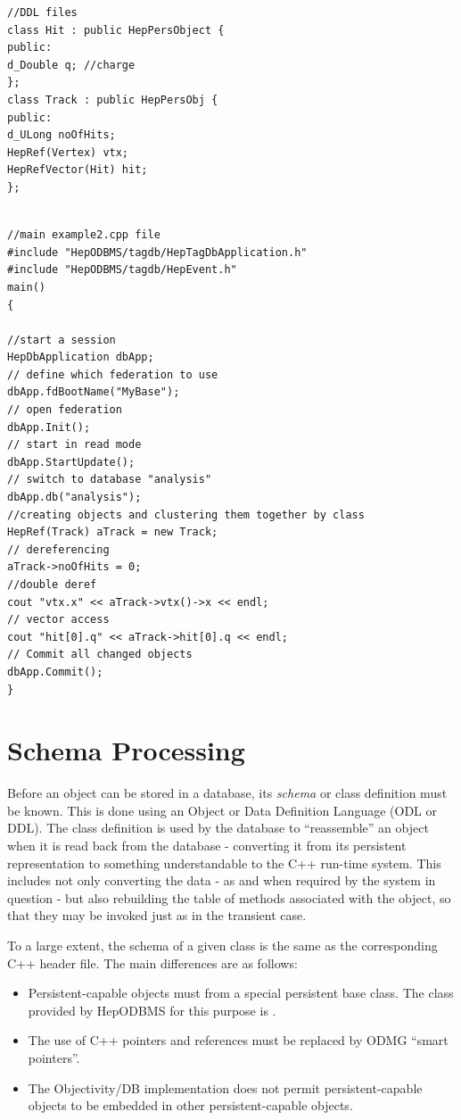 \begin{verbatim}
//DDL files 
class Hit : public HepPersObject { 
public: 
d_Double q; //charge
}; 
class Track : public HepPersObj { 
public: 
d_ULong noOfHits; 
HepRef(Vertex) vtx; 
HepRefVector(Hit) hit;
}; 
\end{verbatim}

\begin{verbatim} 

//main example2.cpp file 
#include "HepODBMS/tagdb/HepTagDbApplication.h" 
#include "HepODBMS/tagdb/HepEvent.h" 
main() 
{ 

//start a session 
HepDbApplication dbApp; 
// define which federation to use 
dbApp.fdBootName("MyBase"); 
// open federation 
dbApp.Init(); 
// start in read mode 
dbApp.StartUpdate(); 
// switch to database "analysis" 
dbApp.db("analysis"); 
//creating objects and clustering them together by class 
HepRef(Track) aTrack = new Track; 
// dereferencing 
aTrack->noOfHits = 0; 
//double deref 
cout "vtx.x" << aTrack->vtx()->x << endl; 
// vector access 
cout "hit[0].q" << aTrack->hit[0].q << endl; 
// Commit all changed objects 
dbApp.Commit();
}

\end{verbatim}
\section{Schema Processing}

\par

Before an object can be stored in a database, its \emph{schema} or class definition
must be known. This is done using an Object or Data Definition Language (ODL or DDL).
The class definition is used by the database to ``reassemble'' 
an object when it is read back from the database - converting it from its persistent representation
to something understandable to the C++ run-time system. This includes not only converting
the data - as and when required by the system in question - but also rebuilding 
the table of methods associated with the object, so that they may be invoked just as
in the transient case.
\par

To a large extent, the schema of a given class is the same as the corresponding C++ header file.
The main differences are as follows:
\begin{itemize}

\item Persistent-capable objects must  from a special persistent base class.
The class provided by HepODBMS for this purpose is .
\item The use of C++ pointers and references must be replaced by ODMG ``smart pointers''.
\item The Objectivity/DB implementation
does not permit persistent-capable objects to be embedded in other persistent-capable
objects.\end{itemize}

